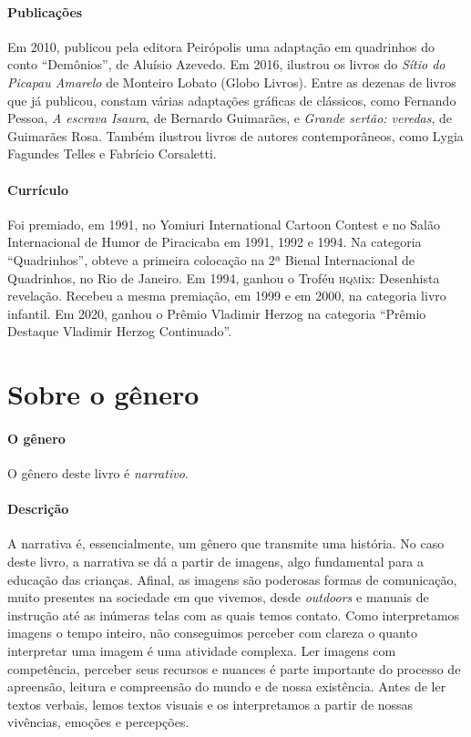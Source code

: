 \documentclass[11pt]{extarticle}
\begin{document}
\paragraph{Publicações} Em 2010, publicou pela editora Peirópolis uma adaptação em quadrinhos do conto ``Demônios'', de Aluísio Azevedo. Em 2016, ilustrou os livros do \textit{Sítio do Picapau Amarelo} de Monteiro Lobato (Globo Livros). Entre as dezenas de livros que já publicou, constam várias adaptações gráficas de clássicos, como Fernando Pessoa, \textit{A escrava Isaura}, de Bernardo Guimarães, e \textit{Grande sertão: veredas}, de Guimarães Rosa. Também ilustrou livros de autores contemporâneos, como Lygia Fagundes Telles e Fabrício Corsaletti.

\paragraph{Currículo} Foi premiado, em 1991, no Yomiuri International Cartoon Contest e no Salão Internacional de Humor de Piracicaba em 1991, 1992 e 1994. Na categoria ``Quadrinhos'', obteve a primeira colocação na 2ª Bienal Internacional de Quadrinhos, no Rio de Janeiro. Em 1994, ganhou o Troféu \textsc{hqm}ix: Desenhista revelação. Recebeu a mesma premiação, em 1999 e em 2000, na categoria livro infantil.
Em 2020, ganhou o Prêmio Vladimir Herzog na categoria ``Prêmio Destaque Vladimir Herzog Continuado''.

\section{Sobre o gênero}

\paragraph{O gênero} O gênero deste livro é \textit{narrativo}. 

\paragraph{Descrição} 
A narrativa é, essencialmente, um gênero que transmite uma história.
No caso deste livro, a narrativa se dá a partir de imagens, algo fundamental para a educação das crianças. Afinal, as imagens são poderosas formas de comunicação, 
muito presentes na sociedade em que vivemos, desde \textit{outdoors} e manuais de 
instrução até as inúmeras telas com as quais temos contato. Como interpretamos 
imagens o tempo inteiro, não conseguimos perceber com clareza o quanto 
interpretar uma imagem é uma atividade complexa. Ler imagens com competência, 
perceber seus recursos e nuances é parte importante do processo de apreensão, 
leitura e compreensão do mundo e de nossa existência. Antes de ler textos 
verbais, lemos textos visuais e os interpretamos a partir de nossas vivências, 
emoções e percepções.
\end{document}
